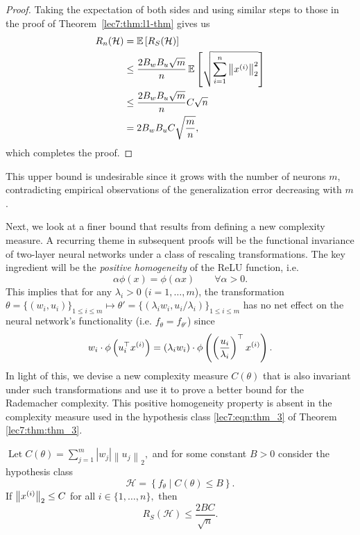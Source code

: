 \begin{proof}
    Taking the expectation of both sides and using similar steps to those in the proof of Theorem~\ref{lec7:thm:l1-thm} gives us
    \begin{align}
        R_n(\mathcal{H})  &= \Exp\left[ R_S(\mathcal{H})\right] \\
        &\leq \frac{2B_wB_u\sqrt{m}}{n} \Exp\sbr{\sqrt{\sum_{i=1}^n \Norm{x\sp{i}}_2^2}} \\
        &\leq \frac{2B_wB_u\sqrt{m}}{n} C\sqrt{n} \\
        &= 2 B_w B_u C\sqrt{\frac{m}{n}},
    \end{align}
    which completes the proof.
    
\end{proof}

This upper bound is undesirable since it grows with the number of neurons $m$, contradicting empirical observations of the generalization error decreasing with $m$.


\newcommand{\boundsforcomp}{B}
Next, we look at a finer bound that results from defining a new complexity measure. A recurring theme in subsequent proofs will be the functional invariance of two-layer neural networks under a class of rescaling transformations. The key ingredient will be the \textit{positive homogeneity} of the ReLU function, i.e.
\begin{equation}
\alpha \phi(x) = \phi(\alpha x) \qquad \forall \alpha > 0.
\end{equation}
This implies that for any $\lambda_i > 0$ ($i = 1, \dots, m$), the transformation $\theta = \{(w_i, u_i)\}_{1 \leq i \leq m} \mapsto \theta' = \{(\lambda_i w_i,  u_i / \lambda_i )\}_{1 \leq i \leq m}$ has no net effect on the neural network's functionality (i.e. $f_{\theta} = f_{\theta'}$) since 
\begin{equation}
w_i\cdot \phi \left(u_i^\top x\sp i \right) = (\lambda_i w_i) \cdot \phi\l(\l( \frac{u_i}{\lambda_i}\r)^\top x\sp i\r).   
\end{equation}
In light of this, we devise a new complexity measure $C(\theta)$ that is also invariant under such transformations and use it to prove a better bound for the Rademacher complexity. This positive homogeneity property is absent in the complexity measure used in the hypothesis class \eqref{lec7:eqn:thm_3} of Theorem \ref{lec7:thm:thm_3}.

\begin{theorem}\label{lec8:thm:thm-improved-nn-rc}
$\operatorname{Let} C(\theta)=\sum_{j=1}^{m}\left|w_{j}\right|\left\|u_{j}\right\|_{2},$ and for some constant $\boundsforcomp>0$ consider the hypothesis class
\begin{equation}
\mathcal{H}=\left\{f_{\theta} \mid C(\theta) \leq \boundsforcomp\right\}. \label{eqn:H}
\end{equation}
If $\left\|x\sp{i}\right\|_{2} \leq C$ for all $i \in\{1, \ldots, n\},$ then
\begin{equation}
R_{S}(\mathcal{H}) \leq \frac{2 \boundsforcomp C}{\sqrt{n}}.
\end{equation}
\end{theorem}


